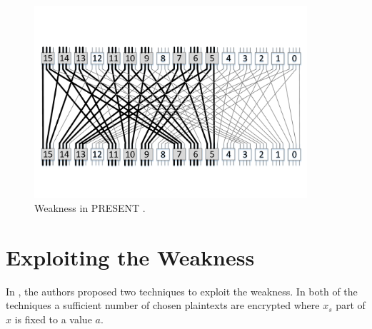 \begin{figure}[h!]
    \centering
    \includegraphics[width=0.9\textwidth]{images/27bittrailPRESENT}
    \caption{Weakness in PRESENT \cite{SSA_Collard_Standaert}.}
    \label{fig:27bittrailPRESENT}
\end{figure}

\section{Exploiting the Weakness}
In \cite{SSA_Collard_Standaert}, the authors proposed two techniques to exploit the weakness. In both of the techniques a sufficient number of chosen plaintexts are encrypted where $x_s$ part of $x$ is fixed to a value $a$.

